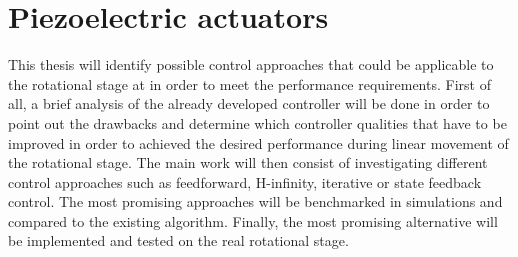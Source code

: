 \chapter{Piezoelectric actuators}\label{cha:}
This thesis will identify possible control approaches that could be applicable to the rotational stage at \abbrCERN in order to meet the performance requirements.
First of all, a brief analysis of the already developed controller will be done in order to point out the drawbacks and determine which controller qualities that have to be improved in order to achieved the desired performance during linear movement of the rotational stage. The main work will then consist of investigating different control approaches such as feedforward, H-infinity, iterative or state feedback control. The most promising approaches will be benchmarked in simulations and compared to the existing algorithm. Finally, the most promising alternative will be implemented and tested on the real rotational stage.

\section{}

\section{}
